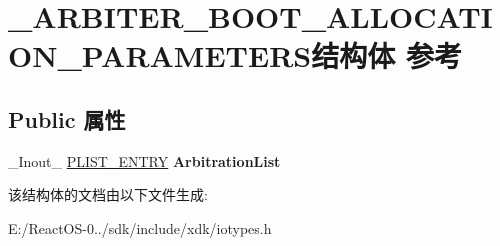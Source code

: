 \hypertarget{struct___a_r_b_i_t_e_r___b_o_o_t___a_l_l_o_c_a_t_i_o_n___p_a_r_a_m_e_t_e_r_s}{}\section{\+\_\+\+A\+R\+B\+I\+T\+E\+R\+\_\+\+B\+O\+O\+T\+\_\+\+A\+L\+L\+O\+C\+A\+T\+I\+O\+N\+\_\+\+P\+A\+R\+A\+M\+E\+T\+E\+R\+S结构体 参考}
\label{struct___a_r_b_i_t_e_r___b_o_o_t___a_l_l_o_c_a_t_i_o_n___p_a_r_a_m_e_t_e_r_s}
\subsection*{Public 属性}
\begin{DoxyCompactItemize}
\item 
\mbox{\label{struct___a_r_b_i_t_e_r___b_o_o_t___a_l_l_o_c_a_t_i_o_n___p_a_r_a_m_e_t_e_r_s_a95079693df7fa3ace2c5f9bf958fe8ef}} 
\+\_\+\+Inout\+\_\+ \hyperlink{struct___l_i_s_t___e_n_t_r_y}{P\+L\+I\+S\+T\+\_\+\+E\+N\+T\+RY} {\bfseries Arbitration\+List}
\end{DoxyCompactItemize}


该结构体的文档由以下文件生成\+:\begin{DoxyCompactItemize}
\item 
E\+:/\+React\+O\+S-\/0../sdk/include/xdk/iotypes.\+h\end{DoxyCompactItemize}
